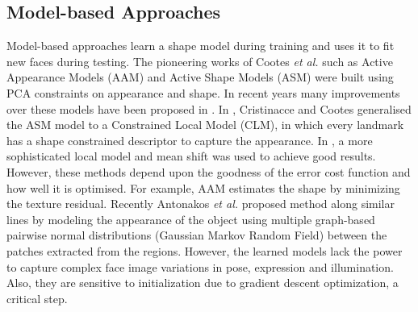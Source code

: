 \documentclass[10pt,twocolumn,letterpaper]{article}
\begin{document}
\subsection{Model-based Approaches}
Model-based approaches learn a shape model during training and uses it to fit new faces during testing. The pioneering works of Cootes \textit{et al.} such as Active Appearance Models (AAM) \cite{AAM} and Active Shape Models (ASM) \cite{Cootes:1995:ASM:206543.206547} were built using PCA constraints on appearance and shape. In recent years many improvements over these models have been proposed in \cite{Matthews:2004:AAM:993451.996344,conf/eccv/LiangXWS08,Gross:2005:GVP:1709142.1709186,Gross:2006:AAM:1709247.1709267,Sauer11accurateregression,doi:10.5244/C.24.91}.  In \cite{Cristinacce06featuredetection}, Cristinacce and Cootes generalised the ASM model to a Constrained Local Model (CLM), in which every landmark has a shape constrained descriptor to capture the appearance. In \cite{Saragih:2011:DMF:1937966.1938021}, a more sophisticated local model and mean shift was used to achieve good results. However, these methods depend upon the goodness of the error cost function and how well it is optimised. For example, AAM estimates the shape by minimizing the texture residual. Recently Antonakos \textit{et al.} \cite{Antonakos_2015_CVPR} proposed method along similar lines by modeling the appearance of the object using multiple graph-based pairwise normal distributions (Gaussian Markov Random Field) between the
patches extracted from the regions. However, the learned models lack the power to capture complex face image variations in pose, expression and illumination. Also, they are sensitive to initialization due to gradient descent optimization, a critical step.
\end{document}
